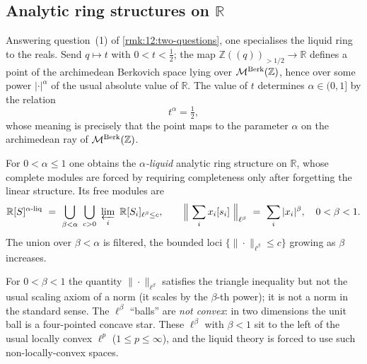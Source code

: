 \subsection{Analytic ring structures on \texorpdfstring{$\mathbb{R}$}{R}}

Answering question~(1) of \cref{rmk:12:two-questions}, one specialises the liquid
ring to the reals. Send $q\mapsto t$ with $0<t<\tfrac12$; the map
$\mathbb{Z}(\!(q)\!)_{>1/2}\to\mathbb{R}$ defines a point of the archimedean
Berkovich space lying over $\mathcal{M}^{\mathrm{Berk}}(\mathbb{Z})$, hence over some power
$|\cdot|^{\alpha}$ of the usual absolute value of $\mathbb{R}$. The value of $t$
determines $\alpha\in(0,1]$ by the relation
\begin{equation*}
t^{\alpha}=\tfrac12,
\end{equation*}
whose meaning is precisely that the point maps to the parameter $\alpha$ on the
archimedean ray of $\mathcal{M}^{\mathrm{Berk}}(\mathbb{Z})$.

\begin{definition}
\label{def:12:alpha-liquid-R}
For $0<\alpha\le1$ one obtains the \emph{$\alpha$-liquid} analytic ring structure
on $\mathbb{R}$, whose complete modules are forced by requiring completeness only
after forgetting the linear structure. Its free modules are
\begin{equation}
\label{eq:12:R-alpha-liquid}
\mathbb{R}[S]^{\alpha\text{-}\mathrm{liq}}\ =\
\bigcup_{\beta<\alpha}\ \bigcup_{c>0}\ \varprojlim_i\
\mathbb{R}[S_i]_{\ell^{\beta}\le c},
\qquad
\Bigl\|\ \sum_i x_i[s_i]\ \Bigr\|_{\ell^{\beta}}\ =\ \sum_i |x_i|^{\beta},
\quad 0<\beta<1.
\end{equation}
The union over $\beta<\alpha$ is filtered, the bounded loci
$\{\|\cdot\|_{\ell^\beta}\le c\}$ growing as $\beta$ increases.
\end{definition}

\begin{remark}
\label{rmk:12:non-locally-convex}
\ts{01:21:46}
For $0<\beta<1$ the quantity $\|\cdot\|_{\ell^\beta}$ satisfies the triangle
inequality but not the usual scaling axiom of a norm (it scales by the
$\beta$-th power); it is not a norm in the standard sense. The $\ell^\beta$
``balls'' are \emph{not convex}: in two dimensions the unit ball is a
four-pointed concave star. These $\ell^\beta$ with $\beta<1$ sit to the left of
the usual locally convex $\ell^p$ ($1\le p\le\infty$), and the liquid theory is
forced to use such non-locally-convex spaces.
\end{remark}

